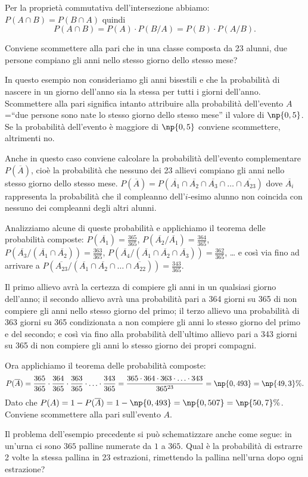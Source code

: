 Per la proprietà commutativa dell'intersezione abbiamo: $P(A\cap B)=P(B\cap A)$ quindi 
\[P(A\cap B)=P(A)\cdot P(B/A)=P(B)\cdot P(A/B).\]
\begin{exrig}
\begin{esempio}
Conviene scommettere alla pari che in una classe composta da 23 alunni, due persone compiano gli anni nello stesso giorno dello stesso mese?

In questo esempio non consideriamo gli anni bisestili e che la probabilità di nascere in un giorno dell'anno sia la stessa per tutti i giorni dell'anno. Scommettere alla pari significa intanto attribuire alla probabilità dell'evento $A$=``due persone sono nate lo stesso giorno dello stesso mese'' il valore di $\np{0,5}$. Se la probabilità dell'evento è maggiore di $\np{0,5}$ conviene scommettere, altrimenti no.

Anche in questo caso conviene calcolare la probabilità dell'evento complementare $P(\overline A)$, cioè la probabilità che nessuno dei 23 allievi compiano gli anni nello stesso giorno dello stesso mese. $P(\overline A)=P(\overline{A_1}\cap \overline{A_2}\cap \overline{A_3}\cap\ldots \cap \overline{A_{23}})$ dove $\overline{A_i}$ rappresenta la probabilità che il compleanno dell'$i$-esimo alunno non coincida con nessuno dei compleanni degli altri alunni.

Analizziamo alcune di queste probabilità e applichiamo il teorema delle probabilità composte: $P(\overline{A_1})=\frac{365}{365}$, $P(\overline {A_2}/\overline{A_1})=\frac{364}{365}$, $P(\overline{A_3}/(\overline{A_1}\cap \overline{A_2}))=\frac{363}{365}$, $P(\overline{A_4}/(\overline{A_1}\cap \overline{A_2}\cap \overline{A_3}))=\frac{362}{365}$, \ldots{} e così via fino ad arrivare a $P(\overline{A_{23}}/(\overline{A_1}\cap \overline{A_2}\cap \ldots \cap \overline{A_{22}}))=\frac{343}{365}$.

Il primo allievo avrà la certezza di compiere gli anni in un qualsiasi giorno dell'anno; il secondo allievo avrà una probabilità pari a 364 giorni su 365 di non compiere gli anni nello stesso giorno del primo; il terzo allievo una probabilità di 363 giorni su 365 condizionata a non compiere gli anni lo stesso giorno del primo e del secondo; e così via fino alla probabilità dell'ultimo allievo pari a 343 giorni su 365 di non compiere gli anni lo stesso giorno dei propri compagni.

Ora applichiamo il teorema delle probabilità composte: \[ P(\overline A)=\frac{365}{365}\cdot \frac{364}{365}\cdot \frac{363}{365}\cdot \ldots \cdot \frac{343}{365}=\frac{365\cdot 364\cdot 363\cdot \ldots \cdot 343}{365^{23}}=\np{0,493}=\np{49,3}\%.\] Dato che $P(A)=1-P(\overline A)=1-\np{0,493}=\np{0,507}=\np{50,7}\%$.
\conclusione Conviene scommettere alla pari sull'evento $A$.
\end{esempio}
\end{exrig}
Il problema dell'esempio precedente si può schematizzare anche come segue: in un'urna ci sono $365$ palline numerate da $1$ a $365$. Qual è la probabilità di estrarre 2 volte la stessa pallina in 23 estrazioni, rimettendo la pallina nell'urna dopo ogni estrazione?

\vspazio\ovalbox{\risolvii \ref{ese:9.60}, \ref{ese:9.61}, \ref{ese:9.62}, \ref{ese:9.63}, \ref{ese:9.64}}
\newpage

\cleardoublepage
